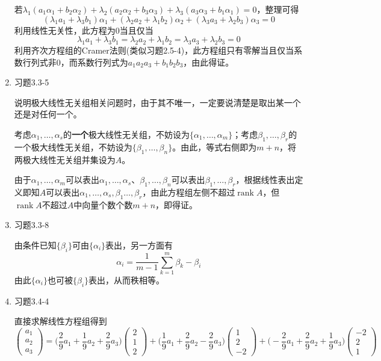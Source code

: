 \documentclass[a4paper,UTF8,fontset=windows]{ctexart}
\DeclareMathOperator{\rank}{rank}
\newcommand*{\note}{\noindent *}
\begin{document}
\begin{enumerate}
    若$\lambda_1(a_1\alpha_1+b_2\alpha_2)+\lambda_2(a_2\alpha_2+b_3\alpha_3)+\lambda_3(a_3\alpha_3+b_1\alpha_1)=0$，整理可得
    $$(\lambda_1a_1+\lambda_3b_1)\alpha_1+(\lambda_2a_2+\lambda_1b_2)\alpha_2+(\lambda_3a_3+\lambda_2b_3)\alpha_3=0$$
    利用线性无关性，此方程为0当且仅当
    $$\lambda_1a_1+\lambda_3b_1=\lambda_2a_2+\lambda_1b_2=\lambda_3a_3+\lambda_2b_3=0$$
    利用齐次方程组的Cramer法则(类似习题2.5-4)，此方程组只有零解当且仅当系数行列式非0，而系数行列式为$a_1a_2a_3+b_1b_2b_3$，由此得证。

    \item 习题3.3-5
    
    \note 说明极大线性无关组相关问题时，由于其不唯一，一定要说清楚是取出某一个还是对任何一个。

    考虑$\alpha_1,\dots,\alpha_s$的\textbf{一个}极大线性无关组，不妨设为$\{\alpha_1,\dots,\alpha_m\}$；考虑$\beta_1,\dots,\beta_r$的一个极大线性无关组，不妨设为$\{\beta_1,\dots,\beta_n\}$。由此，等式右侧即为$m+n$，将两极大线性无关组并集设为$A$。

    由于$\alpha_1,\dots,\alpha_m$可以表出$\alpha_1,\dots,\alpha_s$、$\beta_1,\dots,\beta_n$可以表出$\beta_1,\dots,\beta_r$，根据线性表出定义即知$A$可以表出$\alpha_1,\dots,\alpha_s,\beta_1\dots,\beta_r$，由此方程组左侧不超过$\rank A$，但$\rank A$不超过$A$中向量个数个数$m+n$，即得证。

    \item 习题3.3-8
    
    由条件已知$\{\beta_i\}$可由$\{\alpha_i\}$表出，另一方面有
    $$\alpha_i=\frac{1}{m-1}\sum_{k=1}^m\beta_k-\beta_i$$
    由此$\{\alpha_i\}$也可被$\{\beta_i\}$表出，从而秩相等。

    \item 习题3.4-4
    
    直接求解线性方程组得到
    $$\begin{pmatrix}a_1\\a_2\\a_3\end{pmatrix}=\bigg(\frac{2}{9}a_1+\frac{1}{9}a_2+\frac{2}{9}a_3\bigg)\begin{pmatrix}2\\1\\2\end{pmatrix}+\bigg(\frac{1}{9}a_1+\frac{2}{9}a_2-\frac{2}{9}a_3\bigg)\begin{pmatrix}1\\2\\-2\end{pmatrix}+\bigg(-\frac{2}{9}a_1+\frac{2}{9}a_2+\frac{1}{9}a_3\bigg)\begin{pmatrix}-2\\2\\1\end{pmatrix}$$
    

\end{enumerate}
\end{document}
